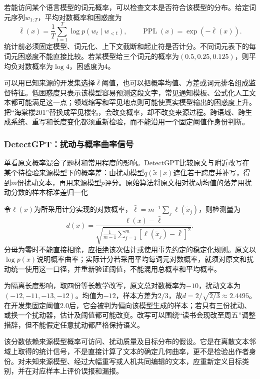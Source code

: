 若能访问某个语言模型的词元概率，可以检查文本是否符合该模型的分布。给定词元序列$w_{1:T}$，平均对数概率和困惑度为
\[
  \bar\ell(x)=\frac1T\sum_{t=1}^{T}\log p(w_t\mid w_{<t}),
  \qquad \operatorname{PPL}(x)=\exp(-\bar\ell(x)).
\]
统计前必须固定模型、词元化、上下文截断和起止符是否计分。不同词元表下的每词元困惑度不能直接比较。若某模型给三个词元的概率为$(0.5,0.25,0.125)$，则平均负对数概率为$\log4$，困惑度为4。

可以用已知来源的开发集选择$\bar\ell$阈值，也可以把概率均值、方差或词元排名组成监督特征。低困惑度只表示该模型容易预测这段文字，常见通知模板、公式化人工文本都可能满足这一点；领域缩写和罕见地点则可能使真实模型输出的困惑度上升。把“海棠楼201”替换成罕见楼名，会改变概率，却不改变来源过程。跨语域、跨生成系统、重写和长度变化都须重新检验，而不能沿用一个固定阈值作身份判断。

\subsubsection{DetectGPT：扰动与概率曲率信号}
\label{sec:nlp-classification-detectgpt}

单看原文概率混合了题材和常用程度的影响。DetectGPT比较原文与附近改写在某个待检验来源模型下的概率差：由扰动模型$q(\widetilde x\mid x)$遮住若干跨度并补写，得到$m$份扰动文本，再用来源模型$p$评分。原始算法将原文相对扰动均值的落差用扰动分数的样本标准差归一化

令$\ell(x)$为所采用计分实现的对数概率，$\bar\ell=m^{-1}\sum_j\ell(\widetilde x_j)$，则检测量为
\begin{equation}
  \label{eq:nlp-classification-detectgpt}
  d(x)=\frac{\ell(x)-\bar\ell}
  {\sqrt{\frac{1}{m-1}\sum_{j=1}^{m}
  [\ell(\widetilde x_j)-\bar\ell]^2}}.
\end{equation}
分母为零时不能直接相除，应拒绝该次估计或使用事先约定的稳定化规则。原文以$\log p(x)$说明概率曲率；实际计分若采用平均每词元对数概率，就须对原文和扰动统一使用这一口径，并重新验证阈值，不能混用总概率和平均概率。

为隔离长度影响，取四份等长教学改写，原文总对数概率为$-10$，扰动文本为$(-12,-11,-13,-12)$。均值为$-12$，样本方差为$2/3$，故$d=2/\sqrt{2/3}\approx2.4495$。在开发集固定阈值2.0后，它会被判为偏向该模型生成的样本；若只有三份扰动、或换一个扰动器，估计及阈值都可能改变。改写可以围绕“读书会现改至周五”调整措辞，但不能假定任意扰动都严格保持语义。

该分数依赖来源模型概率可访问、扰动质量及目标分布的假设。它是在离散文本邻域上取得的统计信号，不是直接计算了文本的确定几何曲率，更不是检验出作者身份。对未知来源模型、经过大幅重写或人机共同编辑的文本，应重新定义目标类别，并在对应样本上评价误报和漏报。

